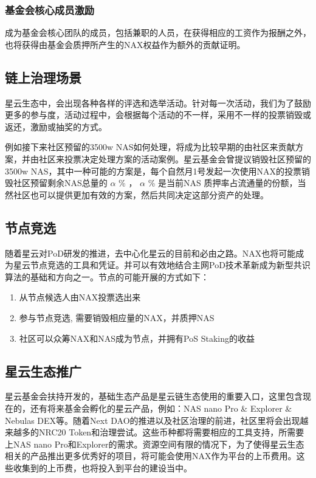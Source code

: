 \subsubsection{基金会核心成员激励}
成为基金会核心团队的成员，包括兼职的人员，在获得相应的工资作为报酬之外，也将获得由基金会质押所产生的NAX权益作为额外的贡献证明。


\subsection{链上治理场景}
星云生态中，会出现各种各样的评选和选举活动。针对每一次活动，我们为了鼓励更多的参与度，活动过程中，会根据每个活动的不一样，采用不一样的投票销毁或返还，激励或抽奖的方式。

例如接下来社区预留的3500w NAS如何处理，将成为比较早期的由社区来贡献方案，并由社区来投票决定处理方案的活动案例。星云基金会曾提议销毁社区预留的3500w NAS，其中一种可能的方案是，每个自然月1号发起一次使用NAX的投票销毁社区预留剩余NAS总量的 \(\alpha\) \% ， \(\alpha\) \% 是当前NAS 质押率占流通量的份额，当然社区也可以提供更加有效的方案，然后共同决定这部分资产的处理。

\subsection{节点竞选}
随着星云对PoD研发的推进，去中心化星云的目前和必由之路。NAX也将可能成为星云节点竞选的工具和凭证。并可以有效地结合主网PoD技术革新成为新型共识算法的基础和方向之一。节点的可能开展的方式如下：
\begin{enumerate}[\hspace{1cm}(a)]
  \item 从节点候选人由NAX投票选出来
  \item 参与节点竞选, 需要销毁相应量的NAX，并质押NAS
  \item 社区可以众筹NAX和NAS成为节点，并拥有PoS Staking的收益
\end{enumerate}

\subsection{星云生态推广}
星云基金会扶持开发的，基础生态产品是星云链生态使用的重要入口，这里包含现在的，还有将来基金会孵化的星云产品，例如：NAS nano Pro \& Explorer \& Nebulas DEX等。随着Next DAO的推进以及社区治理的前进，社区里将会出现越来越多的NRC20 Token和治理尝试。这些币种都将需要相应的工具支持，所需要上NAS nano Pro和Explorer的需求。资源空间有限的情况下，为了使得星云生态相关的产品推出更多优秀好的项目，将可能会使用NAX作为平台的上币费用。这些收集到的上币费，也将投入到平台的建设当中。